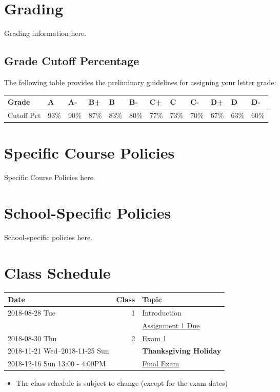 \documentclass[article,letterpaper,times,10pt,listings-bw,microtype]{scrartcl}
\begin{document}
\section*{Grading}
\label{sec:org50c98a3}
Grading information here.
\subsection*{Grade Cutoff Percentage}
\label{sec:org393090d}
The following table provides the preliminary guidelines for assigning your
letter grade:

\begin{center}
\begin{tabular}{llllllllllll}
\hline
Grade & A & A- & B+ & B & B- & C+ & C & C- & D+ & D & D-\\
\hline
Cutoff Pct & 93\% & 90\% & 87\% & 83\% & 80\% & 77\% & 73\% & 70\% & 67\% & 63\% & 60\%\\
\hline
\end{tabular}
\end{center}
\section*{Specific Course Policies}
\label{sec:orga3ba03f}
Specific Course Policies here.
\section*{School-Specific Policies}
\label{sec:org6fae985}
School-specific policies here.
\clearpage
\section*{Class Schedule}
\label{sec:orgae1aac7}
\begin{center}
\begin{tabular}{lrl}
Date & Class & Topic\\
\hline
2018-08-28 Tue & 1 & Introduction\\
 &  & \uline{Assignment 1 Due}\\
2018-08-30 Thu & 2 & \uline{Exam 1}\\
2018-11-21 Wed--2018-11-25 Sun &  & \textbf{Thanksgiving Holiday}\\
2018-12-16 Sun 13:00  - 4:00PM &  & \uline{Final Exam}\\
\end{tabular}
\end{center}

\begin{mdframed}[style=exampledefault, frametitle={Disclaimer}]
\begin{itemize}
\item The class schedule is subject to change (except for the exam dates)
\end{itemize}
\end{mdframed}
\end{document}
